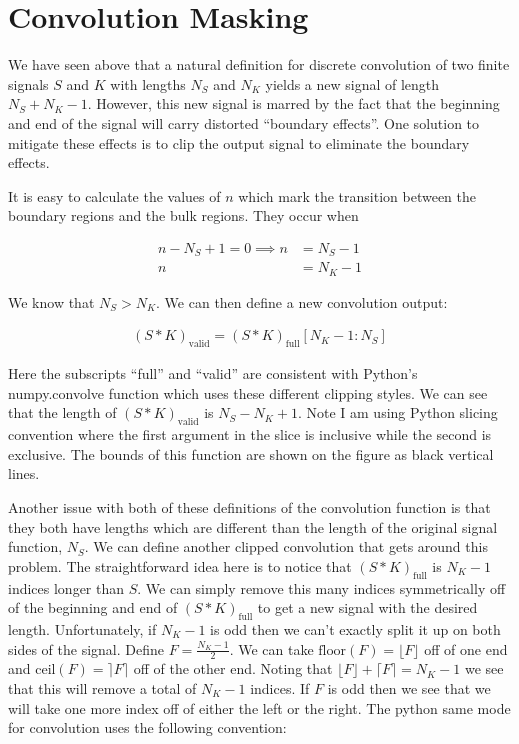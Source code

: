 \documentclass[12pt]{article}
\begin{document}
\section{Convolution Masking}

We have seen above that a natural definition for discrete convolution of two finite signals $S$ and $K$ with lengths $N_S$ and $N_K$ yields a new signal of length $N_S + N_K - 1$. However, this new signal is marred by the fact that the beginning and end of the signal will carry distorted ``boundary effects''. One solution to mitigate these effects is to clip the output signal to eliminate the boundary effects.

It is easy to calculate the values of $n$ which mark the transition between the boundary regions and the bulk regions. They occur when 

\begin{align}
n-N_S+1 = 0 \implies n &= N_S - 1\\
n &= N_K-1
\end{align}

We know that $N_S > N_K$. We can then define a new convolution output:

\begin{align}
(S \ast K)_{\text{valid}} = (S \ast K)_{\text{full}}[N_K - 1:N_S]
\end{align}

Here the subscripts ``full'' and ``valid'' are consistent with Python's numpy.convolve function which uses these different clipping styles. We can see that the length of $(S \ast K)_{\text{valid}}$ is $N_S - N_K + 1$. Note I am using Python slicing convention where the first argument in the slice is inclusive while the second is exclusive. The bounds of this function are shown on the figure as black vertical lines.

Another issue with both of these definitions of the convolution function is that they both have lengths which are different than the length of the original signal function, $N_S$. We can define another clipped convolution that gets around this problem. The straightforward idea here is to notice that $(S \ast K)_{\text{full}}$ is $N_K-1$ indices longer than $S$. We can simply remove this many indices symmetrically off of the beginning and end of $(S \ast K)_{\text{full}}$ to get a new signal with the desired length. Unfortunately, if $N_K-1$ is odd then we can't exactly split it up on both sides of the signal. Define $F=\frac{N_K-1}{2}$. We can take $\text{floor}(F) = \lfloor F \rfloor$ off of one end and $\text{ceil}(F) = \rceil F \rceil$ off of the other end. Noting that $\lfloor F \rfloor + \lceil F \rceil = N_K-1$ we see that this will remove a total of $N_K-1$ indices. If $F$ is odd then we see that we will take one more index off of either the left or the right. The python same mode for convolution uses the following convention:
\end{document}
